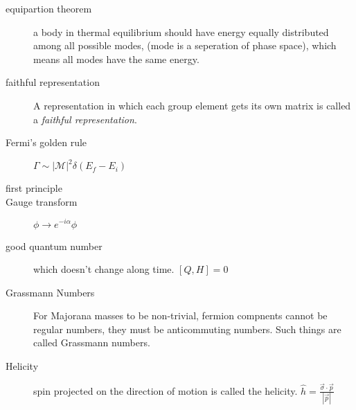 \begin{description}
    \item [equipartion theorem] a body in thermal equilibrium should have
	energy equally distributed among all possible modes, (mode is a
	seperation of phase space), which means all modes have the same
	energy.

    \item [faithful representation] A representation in which each group
	element gets its own matrix is called a \emph{faithful
	representation}.
    \item [Fermi's golden rule]	$\Gamma \sim |\mathcal{M}|^{2}\delta(E_f - E_i)$
    \item [first principle]

    \item [Gauge transform] $\phi \rightarrow e^{-i\alpha}\phi$
    \item [good quantum number] which doesn't change along time. $[Q, H] = 0$
    \item [Grassmann Numbers] For Majorana masses to be non-trivial, fermion 
	compnents cannot be regular numbers, they must be anticommuting numbers. 
	Such things are called Grassmann numbers.

    \item [Helicity] spin projected on the direction of motion is called the
	helicity. $\hat{h}=\frac{\vec{\sigma}\cdot\vec{p}}{|\vec{p}|}$


\end{description}

